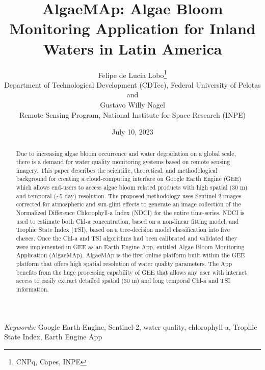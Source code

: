 \documentclass[
  12pt]{article}
\begin{document}
\def\spacingset#1{\renewcommand{\baselinestretch}%
{#1}\small\normalsize} \spacingset{1}



\date{July 10, 2023}
\title{\bf AlgaeMAp: Algae Bloom Monitoring Application for Inland
Waters in Latin America}
\author{
Felipe de Lucia Lobo\thanks{CNPq, Capes, INPE}\\
Department of Technological Development (CDTec), Federal University of
Pelotas\\
and\\Gustavo Willy Nagel\\
Remote Sensing Program, National Institute for Space Research (INPE)\\
}
\maketitle

\bigskip
\bigskip
\begin{abstract}
Due to increasing algae bloom occurrence and water degradation on a
global scale, there is a demand for water quality monitoring systems
based on remote sensing imagery. This paper describes the scientific,
theoretical, and methodological background for creating a
cloud-computing interface on Google Earth Engine (GEE) which allows
end-users to access algae bloom related products with high spatial (30
m) and temporal (\textasciitilde5 day) resolution. The proposed
methodology uses Sentinel-2 images corrected for atmospheric and
sun-glint effects to generate an image collection of the Normalized
Difference Chlorophyll-a Index (NDCI) for the entire time-series. NDCI
is used to estimate both Chl-a concentration, based on a non-linear
fitting model, and Trophic State Index (TSI), based on a tree-decision
model classification into five classes. Once the Chl-a and TSI
algorithms had been calibrated and validated they were implemented in
GEE as an Earth Engine App, entitled Algae Bloom Monitoring Application
(AlgaeMAp). AlgaeMAp is the first online platform built within the GEE
platform that offers high spatial resolution of water quality
parameters. The App benefits from the huge processing capability of GEE
that allows any user with internet access to easily extract detailed
spatial (30 m) and long temporal Chl-a and TSI information.
\end{abstract}

\noindent%
{\it Keywords:} Google Earth Engine, Sentinel-2, water
quality, chlorophyll-a, Trophic State Index, Earth Engine App
\vfill
\end{document}
